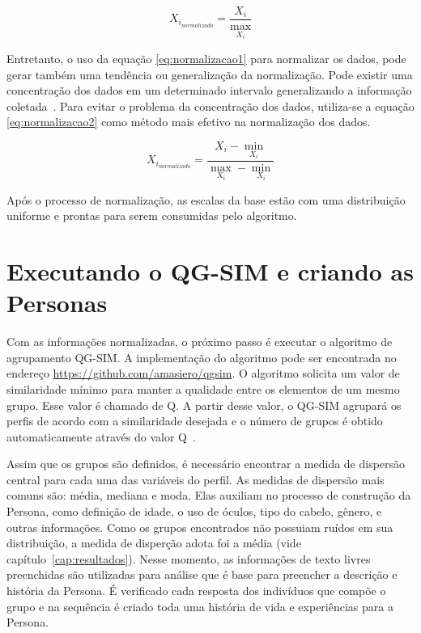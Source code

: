 \begin{equation}
	X_{i_{normalizado}} = \frac{X_i}{\max_{X_i}}
	\label{eq:normalizacao1}
\end{equation}

Entretanto, o uso da equação \ref{eq:normalizacao1} para normalizar os dados, pode gerar também uma tendência ou generalização da normalização. Pode existir uma concentração dos dados em um determinado intervalo generalizando a informação coletada~\cite{masiero:2013}. Para evitar o problema da concentração dos dados, utiliza-se a equação \ref{eq:normalizacao2} como método mais efetivo na normalização dos dados.

\begin{equation}
	X_{i_{normalizado}} = \frac{X_i - \min_{X_i}}{\max_{X_i} - \min_{X_i}}
	\label{eq:normalizacao2}
\end{equation}

Após o processo de normalização, as escalas da base estão com uma distribuição uniforme e prontas para serem consumidas pelo algoritmo.

\section{Executando o QG-SIM e criando as Personas}
\label{sec:criarpersonas}
Com as informações normalizadas, o próximo passo é executar o algoritmo de agrupamento QG-SIM. A implementação do algoritmo pode ser encontrada no endereço \url{https://github.com/amasiero/qgsim}. O algoritmo solicita um valor de similaridade mínimo para manter a qualidade entre os elementos de um mesmo grupo. Esse valor é chamado de Q. A partir desse valor, o QG-SIM agrupará os perfis de acordo com a similaridade desejada e o número de grupos é obtido automaticamente através do valor Q~\cite{masiero:2013}.

Assim que os grupos são definidos, é necessário encontrar a medida de dispersão central para cada uma das variáveis do perfil. As medidas de dispersão mais comuns são: média, mediana e moda. Elas auxiliam no processo de construção da Persona, como definição de idade, o uso de óculos, tipo do cabelo, gênero, e outras informações. Como os grupos encontrados não possuiam ruídos em sua distribuição, a medida de disperção adota foi a média (vide capítulo~\ref{cap:resultados}). Nesse momento, as informações de texto livres preenchidas são utilizadas para análise que é base para preencher a descrição e história da Persona. É verificado cada resposta dos indivíduos que compõe o grupo e na sequência é criado toda uma história de vida e experiências para a Persona.

